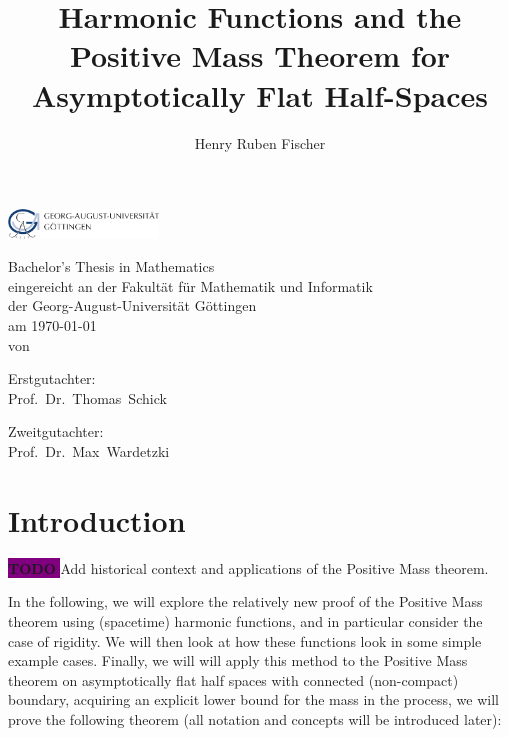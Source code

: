\documentclass[titlepage,numbers=noenddot,headinclude,oneside,%
footinclude=true,cleardoublepage=empty,%
BCOR=5mm,paper=a4,fontsize=11pt,%
english,%
]{scrartcl}
\title{Harmonic Functions and the Positive Mass Theorem for Asymptotically Flat Half-Spaces}
\author{Henry Ruben Fischer}
\newcommand{\todomark}{%
    \colorbox{purple}{%
        \textnormal\ttfamily\bfseries\color{white}%
        TODO%
    }%
}
\newcommand{\todo}[1][]{%
    \ifstrempty{#1}{%
        \def\todotext{Todo}%
    }{%
        \def\todotext{Todo: #1}%
    }%
    \todomark%
    {%
        \marginpar{%
            \raggedright\normalfont\sffamily\scriptsize\todotext%
        }%
    }%
}
\begin{document}
\theoremstyle{plain}
\makeatletter
\begin{titlepage}
\begin{center}

\textsc{\LARGE \@title}

\vspace{2cm}

\includegraphics[width=0.3\textwidth]{Logo.pdf}

\vspace{1.5cm}

\Large Bachelor's Thesis in Mathematics \\
\Large eingereicht an der Fakultät für Mathematik und Informatik\\
\Large der Georg-August-Universität Göttingen\\
am \today\\

\vspace{1cm}
\small{von}\\

\large{\@author}
\vspace{1cm}

\small{Erstgutachter:}\\

\large{Prof.~Dr.~Thomas~Schick}

\vspace{1cm}

\small{Zweitgutachter:}\\

\large{Prof.~Dr.~Max~Wardetzki}

\end{center}
\end{titlepage}
\makeatother

\tableofcontents
\newpage
{}
\section{Introduction}

\todo{Add historical context and applications of the Positive Mass theorem.}

In the following, we will explore the relatively new proof of the Positive Mass theorem using (spacetime) harmonic functions, and in particular consider the case of rigidity. We will then look at how these functions look in some simple example cases. Finally, we will will apply this method to the Positive Mass theorem on asymptotically flat half spaces with connected (non-compact) boundary, acquiring an explicit lower bound for the mass in the process, \ie we will prove the following theorem (all notation and concepts will be introduced later):
\end{document}
